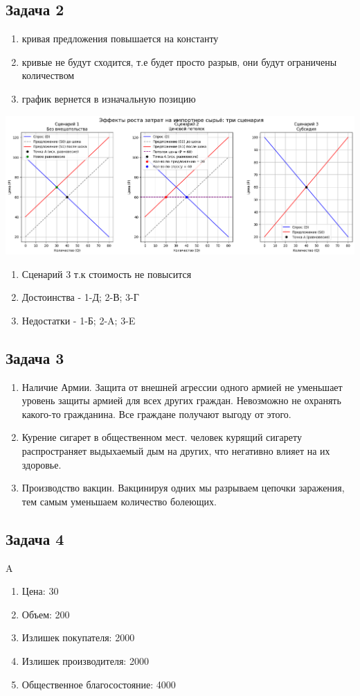 \documentclass[a4paper,12pt]{article}
\begin{document}
\subsection{Задача 2}
\begin{enumerate}
    \item кривая предложения повышается на константу 
    \item кривые не будут сходится, т.е будет просто разрыв, они будут ограничены количеством
    \item график вернется в изначальную позицию
\end{enumerate}
\includegraphics[scale=0.4]{graphs/3.1.png}
\begin{enumerate}
    \item Сценарий 3 т.к стоимость не повысится
    \item Достоинства - 1-Д; 2-В; 3-Г
    \item Недостатки - 1-Б; 2-A; 3-E
\end{enumerate}

\subsection{Задача 3}
\begin{enumerate}
    \item Наличие Армии. Защита от внешней агрессии одного армией не уменьшает уровень защиты армией для всех других граждан. Невозможно не охранять какого-то гражданина. Все граждане получают выгоду от этого.
    \item Курение сигарет в общественном мест. человек курящий сигарету распространяет выдыхаемый дым на других, что негативно влияет на их здоровье.
    \item Производство вакцин. Вакцинируя одних мы разрываем цепочки заражения, тем самым уменьшаем количество болеющих.
\end{enumerate}

\subsection{Задача 4}
A
\begin{enumerate}
    \item Цена: 30
    \item Объем: 200
    \item Излишек покупателя: 2000
    \item Излишек производителя: 2000
    \item Общественное благосостояние: 4000
\end{enumerate}
\end{document}
